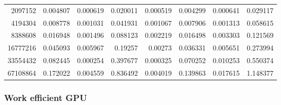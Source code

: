 \begin{tabular}{r r r r r r r r}
2097152 & 0.004807 & 0.000619 & 0.020011 & 0.000519 & 0.004299 & 0.000641 & 0.029117 \\
4194304 & 0.008778 & 0.001031 & 0.041931 & 0.001067 & 0.007906 & 0.001313 & 0.058615 \\
8388608 & 0.016948 & 0.001496 & 0.088123 & 0.002219 & 0.016498 & 0.003303 & 0.121569 \\
16777216 & 0.045093 & 0.005967 & 0.19257 & 0.00273 & 0.036331 & 0.005651 & 0.273994 \\
33554432 & 0.082445 & 0.000254 & 0.397677 & 0.000325 & 0.070252 & 0.010253 & 0.550374 \\
67108864 & 0.172022 & 0.004559 & 0.836492 & 0.004019 & 0.139863 & 0.017615 & 1.148377 \\
\end{tabular}

\subsubsection{Work efficient GPU}

